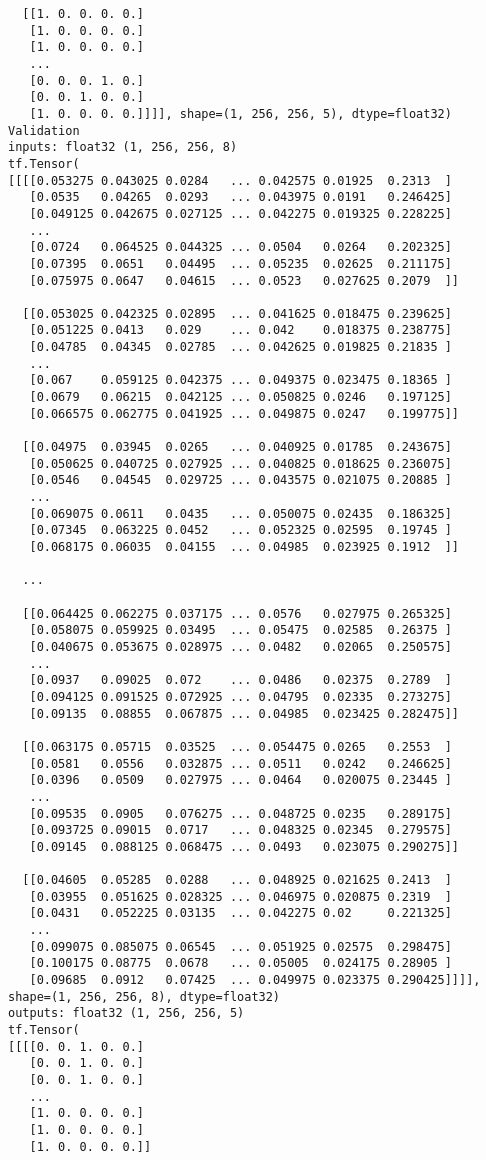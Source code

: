 \documentclass[
  letterpaper,
  DIV=11,
  numbers=noendperiod]{scrreprt}
\begin{document}
\begin{verbatim}
  [[1. 0. 0. 0. 0.]
   [1. 0. 0. 0. 0.]
   [1. 0. 0. 0. 0.]
   ...
   [0. 0. 0. 1. 0.]
   [0. 0. 1. 0. 0.]
   [1. 0. 0. 0. 0.]]]], shape=(1, 256, 256, 5), dtype=float32)
Validation
inputs: float32 (1, 256, 256, 8)
tf.Tensor(
[[[[0.053275 0.043025 0.0284   ... 0.042575 0.01925  0.2313  ]
   [0.0535   0.04265  0.0293   ... 0.043975 0.0191   0.246425]
   [0.049125 0.042675 0.027125 ... 0.042275 0.019325 0.228225]
   ...
   [0.0724   0.064525 0.044325 ... 0.0504   0.0264   0.202325]
   [0.07395  0.0651   0.04495  ... 0.05235  0.02625  0.211175]
   [0.075975 0.0647   0.04615  ... 0.0523   0.027625 0.2079  ]]

  [[0.053025 0.042325 0.02895  ... 0.041625 0.018475 0.239625]
   [0.051225 0.0413   0.029    ... 0.042    0.018375 0.238775]
   [0.04785  0.04345  0.02785  ... 0.042625 0.019825 0.21835 ]
   ...
   [0.067    0.059125 0.042375 ... 0.049375 0.023475 0.18365 ]
   [0.0679   0.06215  0.042125 ... 0.050825 0.0246   0.197125]
   [0.066575 0.062775 0.041925 ... 0.049875 0.0247   0.199775]]

  [[0.04975  0.03945  0.0265   ... 0.040925 0.01785  0.243675]
   [0.050625 0.040725 0.027925 ... 0.040825 0.018625 0.236075]
   [0.0546   0.04545  0.029725 ... 0.043575 0.021075 0.20885 ]
   ...
   [0.069075 0.0611   0.0435   ... 0.050075 0.02435  0.186325]
   [0.07345  0.063225 0.0452   ... 0.052325 0.02595  0.19745 ]
   [0.068175 0.06035  0.04155  ... 0.04985  0.023925 0.1912  ]]

  ...

  [[0.064425 0.062275 0.037175 ... 0.0576   0.027975 0.265325]
   [0.058075 0.059925 0.03495  ... 0.05475  0.02585  0.26375 ]
   [0.040675 0.053675 0.028975 ... 0.0482   0.02065  0.250575]
   ...
   [0.0937   0.09025  0.072    ... 0.0486   0.02375  0.2789  ]
   [0.094125 0.091525 0.072925 ... 0.04795  0.02335  0.273275]
   [0.09135  0.08855  0.067875 ... 0.04985  0.023425 0.282475]]

  [[0.063175 0.05715  0.03525  ... 0.054475 0.0265   0.2553  ]
   [0.0581   0.0556   0.032875 ... 0.0511   0.0242   0.246625]
   [0.0396   0.0509   0.027975 ... 0.0464   0.020075 0.23445 ]
   ...
   [0.09535  0.0905   0.076275 ... 0.048725 0.0235   0.289175]
   [0.093725 0.09015  0.0717   ... 0.048325 0.02345  0.279575]
   [0.09145  0.088125 0.068475 ... 0.0493   0.023075 0.290275]]

  [[0.04605  0.05285  0.0288   ... 0.048925 0.021625 0.2413  ]
   [0.03955  0.051625 0.028325 ... 0.046975 0.020875 0.2319  ]
   [0.0431   0.052225 0.03135  ... 0.042275 0.02     0.221325]
   ...
   [0.099075 0.085075 0.06545  ... 0.051925 0.02575  0.298475]
   [0.100175 0.08775  0.0678   ... 0.05005  0.024175 0.28905 ]
   [0.09685  0.0912   0.07425  ... 0.049975 0.023375 0.290425]]]], shape=(1, 256, 256, 8), dtype=float32)
outputs: float32 (1, 256, 256, 5)
tf.Tensor(
[[[[0. 0. 1. 0. 0.]
   [0. 0. 1. 0. 0.]
   [0. 0. 1. 0. 0.]
   ...
   [1. 0. 0. 0. 0.]
   [1. 0. 0. 0. 0.]
   [1. 0. 0. 0. 0.]]


\end{verbatim}
\end{document}

